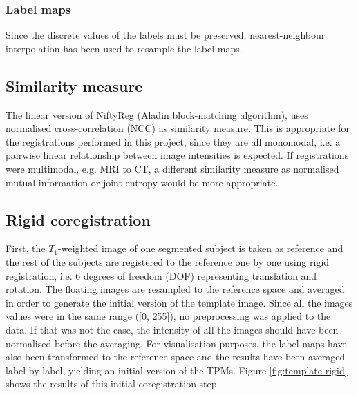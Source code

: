 \subsubsection{Label maps} Since the discrete values of the labels must be preserved, nearest-neighbour interpolation has been used to resample the label maps.



\subsection{Similarity measure}
The linear version of NiftyReg (Aladin block-matching algorithm), uses normalised cross-correlation (NCC) as similarity measure. This is appropriate for the registrations performed in this project, since they are all monomodal, i.e. a pairwise linear relationship between image intensities is expected. If registrations were multimodal, e.g. MRI to CT, a different similarity measure as normalised mutual information or joint entropy would be more appropriate.



\subsection{Rigid coregistration}
First, the $T_1$-weighted image of one segmented subject is taken as reference and the rest of the subjects are registered to the reference one by one using rigid registration, i.e. 6 degrees of freedom (DOF) representing translation and rotation. The floating images are resampled to the reference space and averaged in order to generate the initial version of the template image. Since all the images values were in the same range ([0, 255]), no preprocessing was applied to the data. If that was not the case, the intensity of all the images should have been normalised before the averaging. For visualisation purposes, the label maps have also been transformed to the reference space and the results have been averaged label by label, yielding an initial version of the TPMs. Figure \ref{fig:template-rigid} shows the results of this initial coregistration step.

